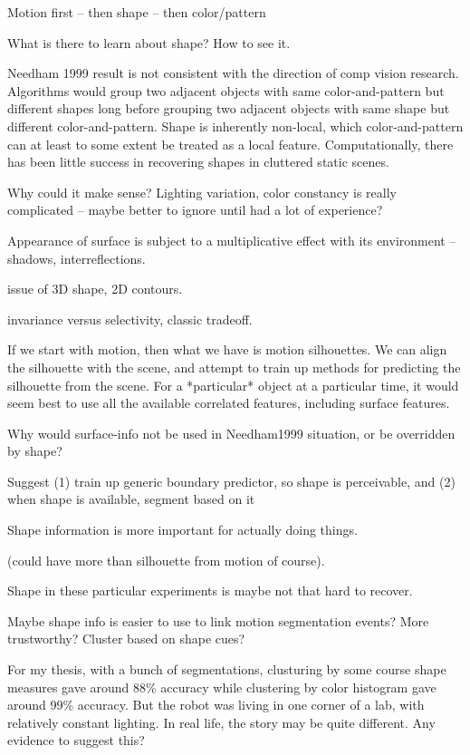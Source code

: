 Motion first -- then shape -- then color/pattern

What is there to learn about shape?  How to see it.

Needham 1999 result is not consistent with the direction of comp
vision research.  Algorithms would group two adjacent objects with
same color-and-pattern but different shapes long before grouping two
adjacent objects with same shape but different color-and-pattern.
Shape is inherently non-local, which color-and-pattern 
can at least to some extent be treated as a local feature.
Computationally, there 
has been little success in recovering shapes in cluttered static scenes.

Why could it make sense?  Lighting variation, color constancy is
really complicated -- maybe better to ignore until had a lot
of experience?

Appearance of surface is subject to a multiplicative effect
with its environment -- shadows, interreflections.

issue of 3D shape, 2D contours.

invariance versus selectivity, classic tradeoff.

If we start with motion, then what we have is motion silhouettes.
We can align the silhouette with the scene, and attempt to train
up methods for predicting the silhouette from the scene.
For a *particular* object at a particular time, it would seem 
best to use all the available correlated features, including 
surface features.  

Why would surface-info not be used in Needham1999 situation,
or be overridden by shape?

Suggest (1) train up generic boundary predictor, so
shape is perceivable, and (2) when shape is available,
segment based on it

Shape information is more important for actually doing things.

(could have more than silhouette from motion of course).


Shape in these particular experiments is maybe not that hard to
recover.

Maybe shape info is easier to use to link motion segmentation
events?  More trustworthy?  Cluster based on shape cues?

For my thesis, with a bunch of segmentations, clusturing by
some course shape measures gave around 88\% accuracy while
clustering by color histogram gave around 99\% accuracy.
But the robot was living in one corner of a lab, with 
relatively constant lighting.  In real life, the story may
be quite different.  Any evidence to suggest this?


